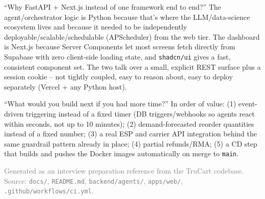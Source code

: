 \documentclass[11pt,a4paper]{article}
\begin{document}
\begin{qabox}{``Why FastAPI + Next.js instead of one framework end to end?''}
The agent/orchestrator logic is Python because that's where the LLM/data-science ecosystem
lives and because it needed to be independently deployable/scalable/schedulable (APScheduler)
from the web tier. The dashboard is Next.js because Server Components let most screens fetch
directly from Supabase with zero client-side loading state, and \texttt{shadcn/ui} gives a fast,
consistent component set. The two talk over a small, explicit REST surface plus a session
cookie -- not tightly coupled, easy to reason about, easy to deploy separately (Vercel + any
Python host).
\end{qabox}

\begin{qabox}{``What would you build next if you had more time?''}
In order of value: (1) event-driven triggering instead of a fixed timer (DB triggers/webhooks
so agents react within seconds, not up to 10 minutes); (2) demand-forecasted reorder quantities
instead of a fixed number; (3) a real ESP and carrier API integration behind the same
guardrail pattern already in place; (4) partial refunds/RMA; (5) a CD step that builds and
pushes the Docker images automatically on merge to \texttt{main}.
\end{qabox}

\vspace{1cm}
\begin{center}
\small\textcolor{gray}{Generated as an interview preparation reference from the TruCart codebase.\\
Source: \texttt{docs/}, \texttt{README.md}, \texttt{backend/agents/}, \texttt{apps/web/}, \texttt{.github/workflows/ci.yml}.}
\end{center}
\end{document}
